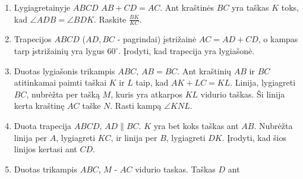 \begin{enumerate}
\item Lygiagretainyje $ABCD$ $AB + CD = AC$. Ant kraštinės $BC$ yra taškas
  $K$ toks, kad $\angle ADB = \angle BDK$.  Raskite $\frac{BK}{KC}$.
\item Trapecijos $ABCD$ ($AD, BC$ - pagrindai) įstrižainė $AC = AD + CD$, o
  kampas tarp įstrižainių yra lygus $60^\circ$. Įrodyti, kad trapecija yra
  lygiašonė.
\item Duotas lygiašonis trikampis $ABC$, $AB = BC$. Ant kraštinių $AB$ ir
  $BC$ atitinkamai paimti taškai $K$ ir $L$ taip, kad $AK + LC = KL$.
  Linija, lygiagreti $BC$, nubrėžta per tašką $M$, kuris yra atkarpos $KL$
  vidurio taškas. Ši linija kerta kraštinę $AC$ taške $N$. Rasti kampą
  $\angle KNL$.
\item Duota trapecija $ABCD$, $AD\parallel{BC}$. $K$ yra bet koks taškas
  ant $AB$. Nubrėžta linija per $A$, lygiagreti $KC$, ir linija per $B$,
  lygiagreti $DK$. Įrodyti, kad šios linijos kertasi ant $CD$.
\item Duotas trikampis $ABC$, $M$ - $AC$ vidurio taskas.  Taškas $D$ ant

\end{enumerate}

